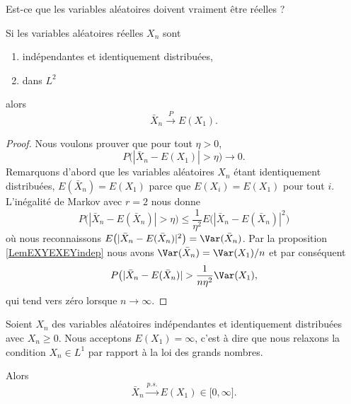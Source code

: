 \begin{probleme}
    Est-ce que les variables aléatoires doivent vraiment être réelles ?
\end{probleme}

\begin{corollary}
    Si les variables aléatoires réelles \( X_n\) sont
    \begin{enumerate}
        \item
            indépendantes et identiquement distribuées,
        \item
            dans \( L^2\)
    \end{enumerate}
    alors
    \begin{equation}
        \bar X_n\stackrel{P}{\longrightarrow}E(X_1).
    \end{equation}
\end{corollary}

\begin{proof}
    Nous voulons prouver que pour tout \( \eta>0\),
    \begin{equation}
        P\big( | \bar X_n-E(X_1) |>\eta \big)\to 0.
    \end{equation}
    Remarquons d'abord que les variables aléatoires \( X_n\) étant identiquement distribuées, \( E(\bar X_n)=E(X_1)\) parce que \( E(X_i)=E(X_1)\) pour tout \( i\). L'inégalité de Markov avec \( r=2\) nous donne
    \begin{equation}
        P\big( | \bar X_n-E(\bar X_n) |>\eta \big)\leq\frac{1}{ \eta^2 }E\big( | \bar X_n-E(\bar X_n) |^2 \big)
    \end{equation}
    où nous reconnaissons \( E\big( | \bar X_n-E(\bar X_n) |^2 \big)=\Var(\bar X_n)\). Par la proposition \ref{LemEXYEXEYindep} nous avons \( \Var(\bar X_n)=\Var(X_1)/n\) et par conséquent
    \begin{equation}
        P\big( | \bar X_n-E(\bar X_n) |>\frac{1}{ n\eta^2 }\Var(X_1),
    \end{equation}
    qui tend vers zéro lorsque \( n\to\infty\).
\end{proof}

\begin{proposition}
    Soient \( X_n\) des variables aléatoires indépendantes et identiquement distribuées avec \( X_n\geq 0\). Nous acceptons \( E(X_1)=\infty\), c'est à dire que nous relaxons la condition \( X_n\in L^1\) par rapport à la loi des grands nombres.

    Alors
    \begin{equation}
        \bar X_n\stackrel{p.s.}{\longrightarrow} E(X_1)\in\mathopen[ 0 , \infty \mathclose].
    \end{equation}
\end{proposition}

